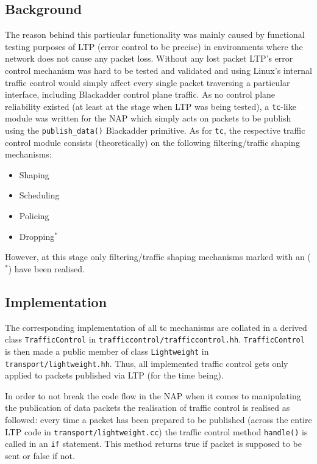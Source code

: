 \documentclass[a4paper,11pt,titlepage]{report}
\begin{document}
\subsection{Background}
The reason behind this particular functionality was mainly caused by functional testing purposes of \ac{LTP} (error control to be precise) in environments where the network does not cause any packet loss. Without any lost packet \ac{LTP}'s error control mechanism was hard to be tested and validated and using Linux's internal traffic control \cite{BertHuber} would simply affect every single packet traversing a particular interface, including Blackadder control plane traffic. As no control plane reliability existed (at least at the stage when \ac{LTP} was being tested), a \texttt{tc}-like module was written for the \ac{NAP} which simply acts on packets to be publish using the \texttt{publish\_data()} Blackadder primitive. As for \texttt{tc}, the respective traffic control module consists (theoretically) on the following filtering/traffic shaping mechanisms:

\begin{itemize}
  \item Shaping
  \item Scheduling
  \item Policing
  \item Dropping$^*$
\end{itemize}

However, at this stage only filtering/traffic shaping mechanisms marked with an ($^*$) have been realised.

\subsection{Implementation}
The corresponding implementation of all tc mechanisms are collated in a derived class \texttt{TrafficControl} in \texttt{trafficcontrol/trafficcontrol.hh}. \texttt{TrafficControl} is then made a public member of class \texttt{Lightweight} in \texttt{transport/lightweight.hh}. Thus, all implemented traffic control gets only applied to packets published via \ac{LTP} (for the time being).

In order to not break the code flow in the \ac{NAP} when it comes to manipulating the publication of data packets the realisation of traffic control is realised as followed: every time a packet has been prepared to be published (across the entire \ac{LTP} code in \texttt{transport/lightweight.cc}) the traffic control method \texttt{handle()} is called in an \texttt{if} statement. This method returns true if packet is supposed to be sent or false if not.
\end{document}
